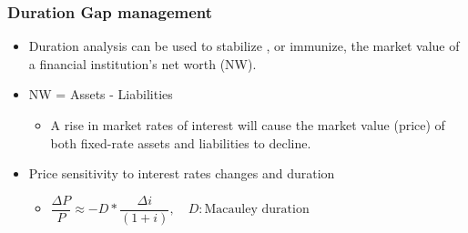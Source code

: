 \subsubsection{Duration Gap management}
\begin{itemize}
\item Duration analysis can be used to stabilize , or immunize, the market value of a financial institution's net worth (NW).
\item NW = Assets - Liabilities
    \begin{itemize}
    \item A rise in market rates of interest will cause the market value (price) of both fixed-rate assets and liabilities to decline.
    \end{itemize}
    
\item Price sensitivity to interest rates changes and duration
    \begin{itemize}
    \item \(\dfrac{\Delta P}{P} \approx -D * \dfrac{\Delta i}{(1 + i)}, \quad D: \text{Macauley duration}\)

    \end{itemize}
    

\end{itemize}

